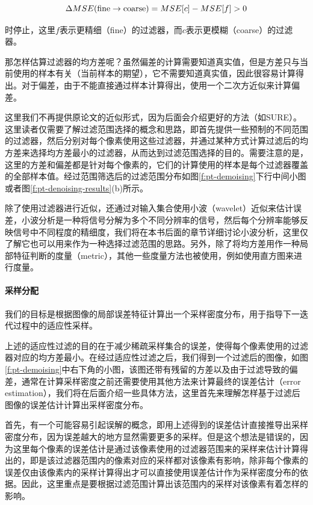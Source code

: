 \begin{equation}
	\Delta MSE({\rm fine}\rightarrow {\rm coarse})=MSE[c]-MSE[f]>0
\end{equation}

\noindent 时停止，这里$f$表示更精细（fine）的过滤器，而$c$表示更模糊（coarse）的过滤器。

那怎样估算过滤器的均方差呢？虽然偏差的计算需要知道真实值，但是方差只与当前使用的样本有关（当前样本的期望），它不需要知道真实值，因此很容易计算得出。对于偏差，由于不能直接通过样本计算得出，\cite{a:AdaptiveSamplingandReconstructionusingGreedyErrorMinimization}使用一个二次方近似来计算偏差。

这里我们不再提供原论文的近似形式，因为后面会介绍更好的方法（如SURE）。这里读者仅需要了解过滤范围选择的概念和思路，即首先提供一些预制的不同范围的过滤器，然后分别对每个像素使用这些过滤器，并通过某种方式计算过滤后的均方差来选择均方差最小的过滤器，从而达到过滤范围选择的目的。需要注意的是，这里的方差和偏差都是针对每个像素的，它们的计算使用的样本是每个过滤器覆盖的全部样本值。经过范围筛选后的过滤范围分布如图\ref{f:pt-demoising}下行中间小图或者图\ref{f:pt-denoising-results}(b)所示。

除了使用过滤器进行近似，\cite{a:AdaptiveWaveletRendering}还通过对输入集合使用小波（wavelet）近似来估计误差，小波分析是一种将信号分解为多个不同分辨率的信号，然后每个分辨率能够反映信号中不同程度的精细度，我们将在本书后面的章节详细讨论小波分析，这里仅了解它也可以用来作为一种选择过滤范围的思路。另外，除了将均方差用作一种局部特征判断的度量（metric），其他一些度量方法也被使用，例如\cite{a:BoostingMonteCarloRenderingbyRayHistogramFusion}使用直方图来进行度量。






\paragraph{采样分配}
我们的目标是根据图像的局部误差特征计算出一个采样密度分布，用于指导下一迭代过程中的适应性采样。

上述的适应性过滤的目的在于减少稀疏采样集合的误差，使得每个像素使用的过滤器对应的均方差最小。在经过适应性过滤之后，我们得到一个过滤后的图像，如图\ref{f:pt-demoising}中右下角的小图，该图还带有残留的方差以及由于过滤导致的偏差，通常在计算采样密度之前还需要使用其他方法来计算最终的误差估计（error estimation），我们将在后面介绍一些具体方法，这里首先来理解怎样基于过滤后图像的误差估计计算出采样密度分布。

首先，有一个可能容易引起误解的概念，即用上述得到的误差估计直接推导出采样密度分布，因为误差越大的地方显然需要更多的采样。但是这个想法是错误的，因为这里每个像素的误差估计是通过该像素使用的过滤器范围来的采样来估计计算得出的，即是该过滤器范围内的像素对应的采样都对该像素有影响，除非每个像素的误差仅由该像素内的采样计算得出才可以直接使用误差估计作为采样密度分布的依据。因此，这里重点是要根据过滤范围计算出该范围内的采样对该像素有着怎样的影响。

